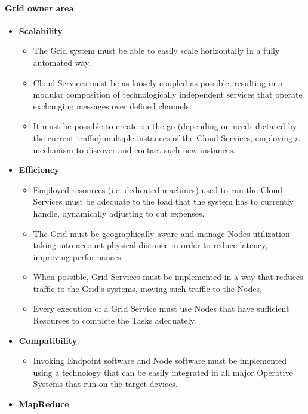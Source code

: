 \paragraph{Grid owner area}
\begin{itemize}
    \item \textbf{Scalability}
    \begin{itemize}
        \item The Grid system must be able to easily scale horizontally in a fully automated way.
        \item Cloud Services must be as loosely coupled as possible, resulting in a modular composition of technologically independent services that operate exchanging messages over defined channels.
        \item It must be possible to create on the go (depending on needs dictated by the current traffic) multiple instances of the Cloud Services, employing a mechanism to discover and contact such new instances.
    \end{itemize}
    \item \textbf{Efficiency}
    \begin{itemize}
        \item Employed resources (i.e. dedicated machines) used to run the Cloud Services must be adequate to the load that the system has to currently handle, dynamically adjusting to cut expenses.
        \item The Grid must be geographically-aware and manage Nodes utilization taking into account physical distance in order to reduce latency, improving performances.
        \item When possible, Grid Services must be implemented in a way that reduces traffic to the Grid's systems, moving such traffic to the Nodes.
        \item Every execution of a Grid Service must use Nodes that have sufficient Resources to complete the Tasks adequately.
    \end{itemize}
    \item \textbf{Compatibility}
    \begin{itemize}
        \item Invoking Endpoint software and Node software must be implemented using a technology that can be easily integrated in all major Operative Systems that run on the target devices.
    \end{itemize}
    \item \textbf{MapReduce}
    \begin{itemize}

\end{itemize}
\end{itemize}
